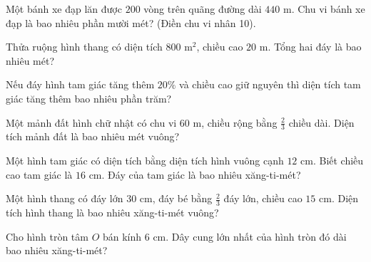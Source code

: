 \begin{ex}
  Một bánh xe đạp lăn được $200$ vòng trên quãng đường dài $440\text{ m}$. Chu vi bánh xe đạp là bao nhiêu phần mười mét? (Điền chu vi nhân 10).
\end{ex}

\begin{ex}
  Thửa ruộng hình thang có diện tích $800\text{ m}^2$, chiều cao $20\text{ m}$. Tổng hai đáy là bao nhiêu mét?
\end{ex}

\begin{ex}
  Nếu đáy hình tam giác tăng thêm $20\%$ và chiều cao giữ nguyên thì diện tích tam giác tăng thêm bao nhiêu phần trăm?
\end{ex}

\begin{ex}
  Một mảnh đất hình chữ nhật có chu vi $60\text{ m}$, chiều rộng bằng $\frac{2}{3}$ chiều dài. Diện tích mảnh đất là bao nhiêu mét vuông?
\end{ex}

\begin{ex}
  Một hình tam giác có diện tích bằng diện tích hình vuông cạnh $12\text{ cm}$. Biết chiều cao tam giác là $16\text{ cm}$. Đáy của tam giác là bao nhiêu xăng-ti-mét?
\end{ex}

\begin{ex}
  Một hình thang có đáy lớn $30\text{ cm}$, đáy bé bằng $\frac{2}{3}$ đáy lớn, chiều cao $15\text{ cm}$. Diện tích hình thang là bao nhiêu xăng-ti-mét vuông?
\end{ex}

\begin{ex}
  Cho hình tròn tâm $O$ bán kính $6\text{ cm}$. Dây cung lớn nhất của hình tròn đó dài bao nhiêu xăng-ti-mét?
\end{ex}

